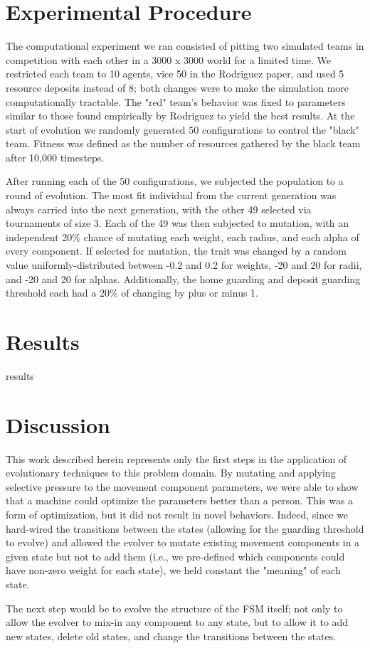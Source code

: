 \documentclass[12pt,journal,compsoc]{IEEEtran}
\begin{document}
\section{Experimental Procedure}

The computational experiment we ran consisted of pitting two simulated teams in competition with each other in a 3000 x 3000 world for a limited time. We restricted each team to 10 agents, vice 50 in the Rodriguez paper, and used 5 resource deposits instead of 8; both changes were to make the simulation more computationally tractable. The "red" team's behavior was fixed to parameters similar to those found empirically by Rodriguez to yield the best results. At the start of evolution we randomly generated 50 configurations to control the "black" team. Fitness was defined as the number of resources gathered by the black team after 10,000 timesteps.

After running each of the 50 configurations, we subjected the population to a round of evolution. The most fit individual from the current generation was always carried into the next generation, with the other 49 selected via tournaments of size 3. Each of the 49 was then subjected to mutation, with an independent 20\% chance of mutating each weight, each radius, and each alpha of every component. If selected for mutation, the trait was changed by a random value uniformly-distributed between -0.2 and 0.2 for weights, -20 and 20 for radii, and -20 and 20 for alphas. Additionally, the home guarding and deposit guarding threshold each had a 20\% of changing by plus or minus 1.

\section{Results}
results

\section{Discussion}
This work described herein represents only the first steps in the application of evolutionary techniques to this problem domain. By mutating and applying selective pressure to the movement component parameters, we were able to show that a machine could optimize the parameters better than a person. This was a form of optimization, but it did not result in novel behaviors. Indeed, since we hard-wired the transitions between the states (allowing for the guarding threshold to evolve) and allowed the evolver to mutate existing movement components in a given state but not to add them (i.e., we pre-defined which components could have non-zero weight for each state), we held constant the "meaning" of each state.

The next step would be to evolve the structure of the FSM itself; not only to allow the evolver to mix-in any component to any state, but to allow it to add new states, delete old states, and change the transitions between the states.



\end{document}
